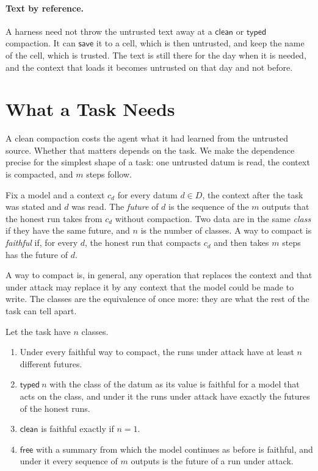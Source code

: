 \documentclass[acmsmall,nonacm,screen]{acmart}
\newcommand{\kw}[1]{\mathsf{#1}}
\newcommand{\op}[1]{\kw{#1}}
\begin{document}
\paragraph{Text by reference.} A harness need not throw the untrusted text away at a
$\op{clean}$ or $\op{typed}$ compaction. It can $\op{save}$ it to a cell, which is then
untrusted, and keep the name of the cell, which is trusted. The text is still there for the
day when it is needed, and the context that loads it becomes untrusted on that day and not
before.

\section{What a Task Needs}
\label{sec:task}

A clean compaction costs the agent what it had learned from the untrusted source. Whether
that matters depends on the task. We make the dependence precise for the simplest shape of a
task: one untrusted datum is read, the context is compacted, and $m$ steps follow.

\begin{definition}
\label{def:task}
Fix a model and a context $c_d$ for every datum $d \in D$, the context after the task was
stated and $d$ was read. The \emph{future} of $d$ is the sequence of the $m$ outputs that
the honest run takes from $c_d$ without compaction. Two data are in the same \emph{class}
if they have the same future, and $n$ is the number of classes. A way to compact is
\emph{faithful} if, for every $d$, the honest run that compacts $c_d$ and then takes $m$
steps has the future of $d$.
\end{definition}

A way to compact is, in general, any operation that replaces the context and that under
attack may replace it by any context that the model could be made to write. The classes are
the equivalence of \citet{nerode1958} once more: they are what the rest of the task can
tell apart.

\begin{theorem}
\label{thm:task}
Let the task have $n$ classes.
\begin{enumerate}
\item Under every faithful way to compact, the runs under attack have at least $n$ different
  futures.
\item $\op{typed}\ n$ with the class of the datum as its value is faithful for a model that
  acts on the class, and under it the runs under attack have exactly the futures of the
  honest runs.
\item $\op{clean}$ is faithful exactly if $n = 1$.
\item $\op{free}$ with a summary from which the model continues as before is faithful, and
  under it every sequence of $m$ outputs is the future of a run under attack.
\end{enumerate}
\end{theorem}
\end{document}
